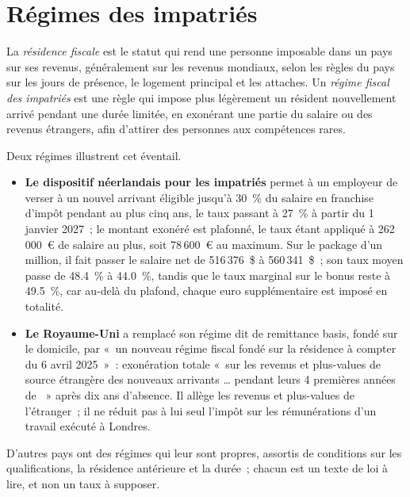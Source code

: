 \section{Régimes des impatriés}

\begin{definition}\label{def:in:pay-regulation-and-tax-by-location:expat}
La \emph{résidence fiscale} est le statut qui rend une personne imposable dans un pays sur ses revenus,
généralement sur les revenus mondiaux, selon les règles du pays sur les jours de présence, le logement principal et les attaches. Un \emph{régime fiscal des
impatriés} est une règle qui impose plus légèrement un résident nouvellement arrivé pendant une durée limitée,
en exonérant une partie du salaire ou des revenus étrangers, afin d'attirer des personnes aux compétences rares.
\end{definition}

Deux régimes illustrent cet éventail.
\begin{itemize}
\item \textbf{Le dispositif néerlandais pour les impatriés} permet à un employeur de verser à un nouvel arrivant éligible jusqu'à 30~\% du salaire en franchise d'impôt pendant au plus
cinq ans, le taux passant à 27~\% à partir du 1 janvier 2027~; le montant exonéré est plafonné, le taux étant appliqué à
262\,000~\euro{} de salaire au plus, soit 78\,600~\euro{} au maximum. Sur le package d'un million, il fait passer le salaire net de 516\,376~\$ à
560\,341~\$~; son taux moyen passe de 48.4~\% à 44.0~\%, tandis que le taux marginal sur le bonus reste à 49.5~\%, car au-delà du
plafond, chaque euro supplémentaire est imposé en totalité.
\item \textbf{Le Royaume-Uni} a remplacé son régime dit de remittance basis, fondé sur le domicile, par «~un nouveau régime fiscal fondé sur
la résidence à compter du 6 avril 2025~»~: exonération totale «~sur les revenus et plus-values de source étrangère des nouveaux arrivants \dots{} pendant leurs 4 premières années de
~» après dix ans d'absence. Il allège les revenus et plus-values de l'étranger~; il ne réduit pas à lui seul
l'impôt sur les rémunérations d'un travail exécuté à Londres.
\end{itemize}
D'autres pays ont des régimes qui leur sont propres, assortis de conditions sur les qualifications, la résidence antérieure et la durée~; chacun
est un texte de loi à lire, et non un taux à supposer.

